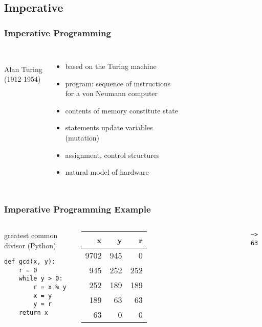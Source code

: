 \documentclass[dvipsnames]{beamer}
\theoremstyle{plain}
\begin{document}
\subsection{Imperative}

\begin{frame}
  \frametitle{Imperative Programming}

  \begin{columns}
    \begin{center}
      \\
      Alan Turing\\
      (1912-1954)
    \end{center}

    \begin{itemize}
      \item based on the Turing machine
      \smallskip
      \item program: sequence of instructions\\
        for a von Neumann computer
      \item contents of memory constitute \alert{state}
      \item statements update variables\\
        (\alert{mutation})

      \pause
      \smallskip
      \item assignment, control structures
      \item natural model of hardware
    \end{itemize}
  \end{columns}
\end{frame}

\begin{frame}[fragile]
  \frametitle{Imperative Programming Example}

  \begin{columns}[b]
    \begin{exampleblock}{greatest common divisor (Python)}
      \begin{lstlisting}
def gcd(x, y):
    r = 0
    while y > 0:
        r = x % y
        x = y
        y = r
    return x
      \end{lstlisting}
    \end{exampleblock}

    \begin{tabular}{|r|r|r|}\hline
   x &   y &   r\\\hline\hline
9702 & 945 &   0\\\hline
 945 & 252 & 252\\\hline
 252 & 189 & 189\\\hline
 189 &  63 &  63\\\hline
  63 &   0 &   0\\\hline
    \end{tabular}

    \medskip
    \lstinline|~> 63|
  \end{columns}
\end{frame}
\end{document}

